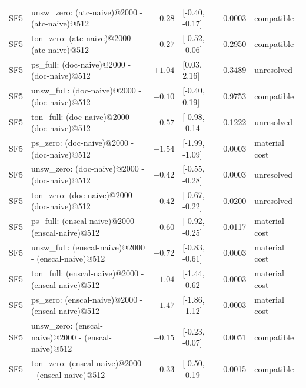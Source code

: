 \begin{table}[t]
\begin{tabular}{l l r l r l}
SF5 & unsw\_zero: (atc-naive)@2000 - (atc-naive)@512 & $-0.28$ & [-0.40, -0.17] & 0.0003 & compatible \\
SF5 & ton\_zero: (atc-naive)@2000 - (atc-naive)@512 & $-0.27$ & [-0.52, -0.06] & 0.2950 & compatible \\
SF5 & ps\_full: (doc-naive)@2000 - (doc-naive)@512 & $+1.04$ & [0.03, 2.16] & 0.3489 & unresolved \\
SF5 & unsw\_full: (doc-naive)@2000 - (doc-naive)@512 & $-0.10$ & [-0.40, 0.19] & 0.9753 & compatible \\
SF5 & ton\_full: (doc-naive)@2000 - (doc-naive)@512 & $-0.57$ & [-0.98, -0.14] & 0.1222 & unresolved \\
SF5 & ps\_zero: (doc-naive)@2000 - (doc-naive)@512 & $-1.54$ & [-1.99, -1.09] & 0.0003 & material cost \\
SF5 & unsw\_zero: (doc-naive)@2000 - (doc-naive)@512 & $-0.42$ & [-0.55, -0.28] & 0.0003 & unresolved \\
SF5 & ton\_zero: (doc-naive)@2000 - (doc-naive)@512 & $-0.42$ & [-0.67, -0.22] & 0.0200 & unresolved \\
SF5 & ps\_full: (enscal-naive)@2000 - (enscal-naive)@512 & $-0.60$ & [-0.92, -0.25] & 0.0117 & material cost \\
SF5 & unsw\_full: (enscal-naive)@2000 - (enscal-naive)@512 & $-0.72$ & [-0.83, -0.61] & 0.0003 & material cost \\
SF5 & ton\_full: (enscal-naive)@2000 - (enscal-naive)@512 & $-1.04$ & [-1.44, -0.62] & 0.0003 & material cost \\
SF5 & ps\_zero: (enscal-naive)@2000 - (enscal-naive)@512 & $-1.47$ & [-1.86, -1.12] & 0.0003 & material cost \\
SF5 & unsw\_zero: (enscal-naive)@2000 - (enscal-naive)@512 & $-0.15$ & [-0.23, -0.07] & 0.0051 & compatible \\
SF5 & ton\_zero: (enscal-naive)@2000 - (enscal-naive)@512 & $-0.33$ & [-0.50, -0.19] & 0.0015 & compatible \\
\bottomrule
\end{tabular}
\end{table}

